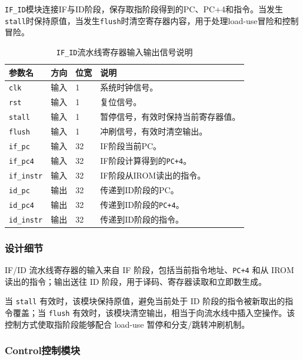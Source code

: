 \documentclass[12pt,a4paper]{ctexart}
\newcommand{\code}[1]{\texttt{#1}}
\begin{document}
\code{IF\_ID}模块连接IF与ID阶段，保存取指阶段得到的PC、PC+4和指令。当发生\code{stall}时保持原值，当发生\code{flush}时清空寄存器内容，用于处理load-use冒险和控制冒险。

\begin{table}[H]
	\centering
	\caption{\code{IF\_ID}流水线寄存器输入输出信号说明}
	\footnotesize
	\renewcommand{\arraystretch}{1.15}
	\begin{tabularx}{\textwidth}{p{3.2cm}p{1.5cm}p{2.1cm}X}
		\toprule
		参数名              & 方向 & 位宽 & 说明                    \\
		\midrule
		\code{clk}       & 输入 & 1  & 系统时钟信号。               \\
		\code{rst}       & 输入 & 1  & 复位信号。                 \\
		\code{stall}     & 输入 & 1  & 暂停信号，有效时保持当前寄存器值。     \\
		\code{flush}     & 输入 & 1  & 冲刷信号，有效时清空输出。         \\
		\code{if\_pc}    & 输入 & 32 & IF阶段当前PC。             \\
		\code{if\_pc4}   & 输入 & 32 & IF阶段计算得到的\code{PC+4}。 \\
		\code{if\_instr} & 输入 & 32 & IF阶段从IROM读出的指令。       \\
		\code{id\_pc}    & 输出 & 32 & 传递到ID阶段的PC。           \\
		\code{id\_pc4}   & 输出 & 32 & 传递到ID阶段的\code{PC+4}。  \\
		\code{id\_instr} & 输出 & 32 & 传递到ID阶段的指令。           \\
		\bottomrule
	\end{tabularx}
\end{table}

\subsubsection*{设计细节}

IF/ID 流水线寄存器的输入来自 IF 阶段，包括当前指令地址、\code{PC+4} 和从 IROM 读出的指令；输出送往 ID 阶段，用于译码、寄存器读取和立即数生成。

当 \code{stall} 有效时，该模块保持原值，避免当前处于 ID 阶段的指令被新取出的指令覆盖；当 \code{flush} 有效时，该模块清空输出，相当于向流水线中插入空操作。该控制方式使取指阶段能够配合 load-use 暂停和分支/跳转冲刷机制。

\subsubsection{Control控制模块}
\end{document}
